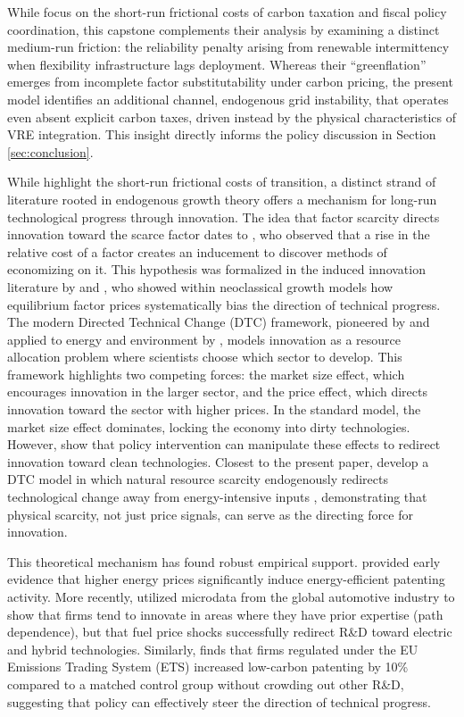 \documentclass[12pt, a4paper]{article}
\begin{document}
	While \citet{airaudo2025green} focus on the short-run frictional costs of carbon taxation and fiscal policy coordination, this capstone complements their analysis by examining a distinct medium-run friction: the reliability penalty arising from renewable intermittency when flexibility infrastructure lags deployment. Whereas their ``greenflation'' emerges from incomplete factor substitutability under carbon pricing, the present model identifies an additional channel, endogenous grid instability, that operates even absent explicit carbon taxes, driven instead by the physical characteristics of VRE integration. This insight directly informs the policy discussion in Section \ref{sec:conclusion}.
	
	While \citet{airaudo2025green} highlight the short-run frictional costs of transition, a distinct strand of literature rooted in endogenous growth theory offers a mechanism for long-run technological progress through innovation. The idea that factor scarcity directs innovation toward the scarce factor dates to \citet{hicks1932}, who observed that a rise in the relative cost of a factor creates an inducement to discover methods of economizing on it. This hypothesis was formalized in the induced innovation literature by \citet{kennedy1964} and \citet{drandakisphelps1966}, who showed within neoclassical growth models how equilibrium factor prices systematically bias the direction of technical progress. The modern Directed Technical Change (DTC) framework, pioneered by \citet{acemoglu2002} and applied to energy and environment by \citet{acemoglu2012environment}, models innovation as a resource allocation problem where scientists choose which sector to develop. This framework highlights two competing forces: the market size effect, which encourages innovation in the larger sector, and the price effect, which directs innovation toward the sector with higher prices. In the standard model, the market size effect dominates, locking the economy into dirty technologies. However, \citet{acemoglu2012environment} show that policy intervention can manipulate these effects to redirect innovation toward clean technologies. Closest to the present paper, \citet{hassler2021} develop a DTC model in which natural resource scarcity endogenously redirects technological change away from energy-intensive inputs ,  demonstrating that physical scarcity, not just price signals, can serve as the directing force for innovation.
	
	This theoretical mechanism has found robust empirical support. \citet{popp2002} provided early evidence that higher energy prices significantly induce energy-efficient patenting activity. More recently, \citet{aghion2016} utilized microdata from the global automotive industry to show that firms tend to innovate in areas where they have prior expertise (path dependence), but that fuel price shocks successfully redirect R\&D toward electric and hybrid technologies. Similarly, \citet{calel2016} finds that firms regulated under the EU Emissions Trading System (ETS) increased low-carbon patenting by 10\% compared to a matched control group without crowding out other R\&D, suggesting that policy can effectively steer the direction of technical progress.
	
\end{document}
